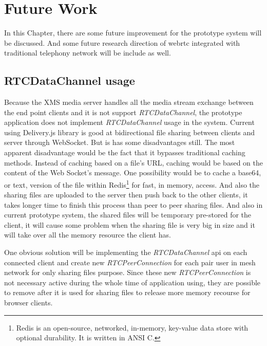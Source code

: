\chapter{Future Work}
\label{chp:future_work}

\noindent In this Chapter, there are some future improvement for the prototype system will be discussed. And some future research direction of \gls{webrtc} integrated with traditional telephony network will be include as well.

\section{RTCDataChannel usage}

\par Because the XMS media server handles all the media stream exchange between the end point clients and it is not support \textit{RTCDataChannel}, the prototype application does not implement \textit{RTCDataChannel} usage in the system. Current using Delivery.js library is good at bidirectional file sharing between clients and server through WebSocket. But is has some disadvantages still. The most apparent disadvantage would be the fact that it bypasses traditional caching methods. Instead of caching based on a file’s URL, caching would be based on the content of the Web Socket’s message. One possibility would be to cache a base64, or text, version of the file within Redis\footnote{Redis is an open-source, networked, in-memory, key-value data store with optional durability. It is written in ANSI C.\cite{wiki:redis}} for fast, in memory, access. And also the sharing files are uploaded to the server then push back to the other clients, it takes longer time to finish this process than peer to peer sharing files. And also in current prototype system, the shared files will be temporary pre-stored for the client, it will cause some problem when the sharing file is very big in size and it will take over all the memory resource the client has.

\par One obvious solution will be implementing the \textit{RTCDataChannel} \gls{api} on each connected client and create new \textit{RTCPeerConnection} for each pair user in mesh network for only sharing files purpose. Since these new \textit{RTCPeerConnection}
is not necessary active during the whole time of application using, they are possible to remove after it is used for sharing files to release more memory recourse for browser clients.

